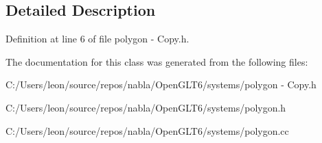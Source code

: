 \subsection{Detailed Description}


Definition at line 6 of file polygon -\/ Copy.\+h.



The documentation for this class was generated from the following files\+:\begin{DoxyCompactItemize}
\item 
C\+:/\+Users/leon/source/repos/nabla/\+Open\+G\+L\+T6/systems/polygon -\/ Copy.\+h\item 
C\+:/\+Users/leon/source/repos/nabla/\+Open\+G\+L\+T6/systems/polygon.\+h\item 
C\+:/\+Users/leon/source/repos/nabla/\+Open\+G\+L\+T6/systems/polygon.\+cc\end{DoxyCompactItemize}
